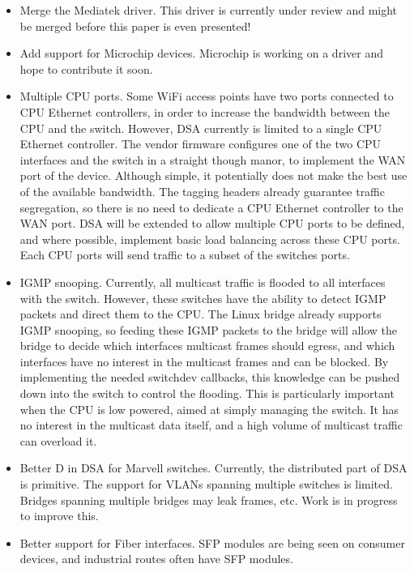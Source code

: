 \documentclass[letterpaper]{article}
\begin{document}
\begin{itemize}
\item Merge the Mediatek driver. This driver is currently under review
  and might be merged before this paper is even presented!
\item Add support for Microchip devices. Microchip is working on a
  driver and hope to contribute it soon.
\item Multiple CPU ports. Some WiFi access points have two ports
  connected to CPU Ethernet controllers, in order to increase the
  bandwidth between the CPU and the switch. However, DSA currently is
  limited to a single CPU Ethernet controller. The vendor firmware
  configures one of the two CPU interfaces and the switch in a
  straight though manor, to implement the WAN port of the
  device. Although simple, it potentially does not make the best use
  of the available bandwidth. The tagging headers already guarantee
  traffic segregation, so there is no need to dedicate a CPU Ethernet
  controller to the WAN port. DSA will be extended to allow multiple
  CPU ports to be defined, and where possible, implement basic load
  balancing across these CPU ports. Each CPU ports will send traffic
  to a subset of the switches ports.
\item IGMP snooping. Currently, all multicast traffic is flooded to
  all interfaces with the switch. However, these switches have the
  ability to detect IGMP packets and direct them to the CPU. The Linux
  bridge already supports IGMP snooping, so feeding these IGMP packets
  to the bridge will allow the bridge to decide which interfaces
  multicast frames should egress, and which interfaces have no
  interest in the multicast frames and can be blocked. By implementing
  the needed switchdev callbacks, this knowledge can be pushed down
  into the switch to control the flooding. This is particularly
  important when the CPU is low powered, aimed at simply managing the
  switch. It has no interest in the multicast data itself, and a high
  volume of multicast traffic can overload it.
\item Better D in DSA for Marvell switches. Currently, the distributed
  part of DSA is primitive. The support for VLANs spanning multiple
  switches is limited. Bridges spanning multiple bridges may leak
  frames, etc. Work is in progress to improve this.
\item Better support for Fiber interfaces. SFP modules are being seen
  on consumer devices, and industrial routes often have SFP modules.
\end{itemize}
\end{document}
